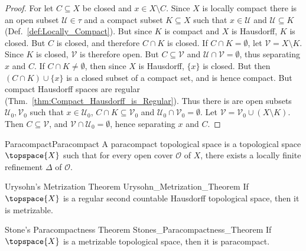 \documentclass{article}                                                        %
\begin{document}
            \begin{proof}
                For let $C\subseteq{X}$ be closed and $x\in{X}\setminus{C}$. Since
                $X$ is locally compact there is an open subset
                $\mathcal{U}\in\tau$ and a compact subset $K\subseteq{X}$ such that
                $x\in\mathcal{U}$ and $\mathcal{U}\subseteq{K}$
                (Def.~\ref{def:Locally_Compact}). But since $K$ is compact and $X$
                is Hausdorff, $K$ is closed. But $C$ is closed, and therefore
                $C\cap{K}$ is closed. If $C\cap{K}=\emptyset$, let
                $\mathcal{V}=X\setminus{K}$. Since $K$ is closed,  $\mathcal{V}$ is
                therefore open. But $C\subseteq\mathcal{V}$ and
                $\mathcal{U}\cap\mathcal{V}=\emptyset$, thus separating $x$ and $C$.
                If $C\cap{K}\ne\emptyset$, then since $X$ is Hausdorff, $\{x\}$ is
                closed. But then $(C\cap{K})\cup\{x\}$ is a closed subset of a
                compact set, and is hence compact. But compact Hausdorff spaces are
                regular (Thm.~\ref{thm:Compact_Hausdorff_is_Regular}). Thus there is
                are open subsets $\mathcal{U}_{0},\mathcal{V}_{0}$ such that
                $x\in\mathcal{U}_{0}$, $C\cap{K}\subseteq\mathcal{V}_{0}$ and
                $\mathcal{U}_{0}\cap\mathcal{V}_{0}=\emptyset$.
                Let $\mathcal{V}=\mathcal{V}_{0}\cup(X\setminus{K})$. Then
                $C\subseteq\mathcal{V}$, and
                $\mathcal{V}\cap\mathcal{U}_{0}=\emptyset$, hence separating
                $x$ and $C$.
            \end{proof}
            \begin{fdefinition}{Paracompact}{Paracompact}
                A paracompact topological space is a topological space
                $\topspace{X}$ such that for every open cover $\mathcal{O}$ of $X$,
                there exists a locally finite refinement $\Delta$ of $\mathcal{O}$.
            \end{fdefinition}
            \begin{ftheorem}{Urysohn's Metrization Theorem}
                            {Urysohn_Metrization_Theorem}
                If $\topspace{X}$ is a regular second countable Hausdorff
                topological space, then it is metrizable.
            \end{ftheorem}
            \begin{ftheorem}{Stone's Paracompactness Theorem}
                            {Stones_Paracompactness_Theorem}
                If $\topspace{X}$ is a metrizable topological space, then it is
                paracompact.
            \end{ftheorem}
\end{document}
